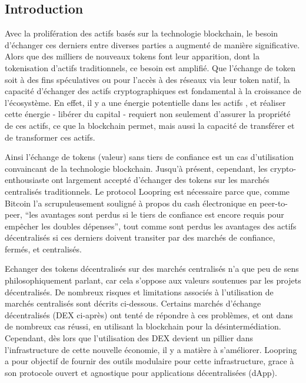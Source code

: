 \documentclass[UTF8,nofonts]{article}
\begin{document}
\begin{multicols}{2}
\section{Introduction\label{sec:introduction}}

Avec la prolifération des actifs basés sur la technologie blockchain, le besoin d'échanger ces derniers entre diverses parties a augmenté de manière significative. Alors que des milliers de nouveaux tokens font leur apparition, dont la tokenisation d'actifs traditionnels, ce besoin est amplifié. Que l'échange de token soit à des fins spéculatives ou  pour l'accès à des réseaux via leur token natif, la capacité d'échanger des actifs cryptographiques est fondamental à la croissance de l'écosystème. En effet, il y a une énergie potentielle dans les actifs \cite{desotocapital}, et réaliser cette énergie - libérer du capital - requiert non seulement d'assurer la propriété de ces actifs, ce que la blockchain permet, mais aussi la capacité de transférer et de transformer ces actifs.
 
Ainsi l'échange de tokens (valeur) sans tiers de confiance est un cas d'utilisation convaincant de la technologie blockchain. Jusqu'à présent, cependant, les crypto-enthousiaste ont largement accepté d'échanger des tokens sur les marchés centralisés traditionnels. Le protocol Loopring est nécessaire parce que, comme Bitcoin l'a scrupuleusement souligné \cite{nakamoto2008bitcoin} à propos du cash électronique en peer-to-peer, \enquote{les avantages sont perdus si le tiers de confiance est encore requis pour empêcher les doubles dépenses}, tout comme sont perdus les avantages des actifs décentralisés si ces derniers doivent transiter par des marchés de confiance, fermés, et centralisés.

Echanger des tokens décentralisés sur des marchés centralisés n'a que peu de sens philosophiquement parlant, car cela s'oppose aux valeurs soutenues par les projets décentralisés. De nombreux risques et limitations associés à l'utilisation de marchés centralisés sont décrits ci-dessous. Certains marchés d'échange décentralisés (DEX ci-après) \cite{schuh2015bitshares} \cite{bancor} \cite{kyber} ont tenté de répondre à ces problèmes, et ont dans de nombreux cas réussi, en utilisant la blockchain pour la désintermédiation. Cependant, dès lors que l'utilisation des DEX devient un pillier dans l'infrastructure de cette nouvelle économie, il y a matière à s'améliorer. Loopring a pour objectif de fournir des outils modulaire pour cette infrastructure, grace à son protocole ouvert et agnostique pour applications décentralisées (dApp).


\end{multicols}
\end{document}

